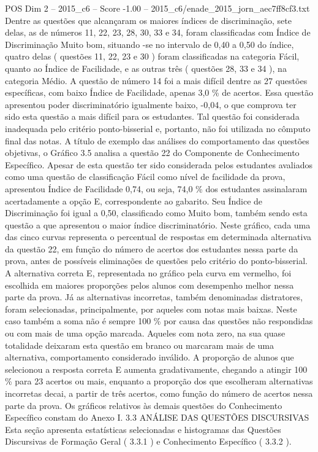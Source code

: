 \begin{textsample}{POS Dim 2 – 2015\_c6 – Score -1.00 – 2015\_c6/enade\_2015\_jorn\_aec7ff8cf3.txt}
Dentre as questões que alcançaram os maiores índices de discriminação, sete delas, as de números 11, 22, 23, 28, 30, 33 e 34, foram classificadas com Índice de Discriminação Muito bom, situando -se no intervalo de 0,40 a 0,50 do índice, quatro delas ( questões 11, 22, 23 e 30 ) foram classificadas na categoria Fácil, quanto ao Índice de Facilidade, e as outras três ( questões 28, 33 e 34 ), na categoria Médio.
A questão de número 14 foi a mais difícil dentre as 27 questões específicas, com baixo Índice de Facilidade, apenas 3,0 \% de acertos.
Essa questão apresentou poder discriminatório igualmente baixo, -0,04, o que comprova ter sido esta questão a mais difícil para os estudantes.
Tal questão foi considerada inadequada pelo critério ponto-bisserial e, portanto, não foi utilizada no cômputo final das notas.
A título de exemplo das análises do comportamento das questões objetivas, o Gráfico 3.5 analisa a questão 22 do Componente de Conhecimento Específico.
Apesar de esta questão ter sido considerada pelos estudantes avaliados como uma questão de classificação Fácil como nível de facilidade da prova, apresentou Índice de Facilidade 0,74, ou seja, 74,0 \% dos estudantes assinalaram acertadamente a opção E, correspondente ao gabarito.
Seu Índice de Discriminação foi igual a 0,50, classificado como Muito bom, também sendo esta questão a que apresentou o maior índice discriminatório.
Neste gráfico, cada uma das cinco curvas representa o percentual de respostas em determinada alternativa da questão 22, em função do número de acertos dos estudantes nessa parte da prova, antes de possíveis eliminações de questões pelo critério do ponto-bisserial.
A alternativa correta E, representada no gráfico pela curva em vermelho, foi escolhida em maiores proporções pelos alunos com desempenho melhor nessa parte da prova.
Já as alternativas incorretas, também denominadas distratores, foram selecionadas, principalmente, por aqueles com notas mais baixas.
Neste caso também a soma não é sempre 100 \% por causa das questões não respondidas ou com mais de uma opção marcada.
Aqueles com nota zero, na sua quase totalidade deixaram esta questão em branco ou marcaram mais de uma alternativa, comportamento considerado inválido.
A proporção de alunos que selecionou a resposta correta E aumenta gradativamente, chegando a atingir 100 \% para 23 acertos ou mais, enquanto a proporção dos que escolheram alternativas incorretas decai, a partir de três acertos, como função do número de acertos nessa parte da prova.
Os gráficos relativos às demais questões do Conhecimento Específico constam do Anexo I. 3.3 ANÁLISE DAS QUESTÕES DISCURSIVAS Esta seção apresenta estatísticas selecionadas e histogramas das Questões Discursivas de Formação Geral ( 3.3.1 ) e Conhecimento Específico ( 3.3.2 ).

\end{textsample}
